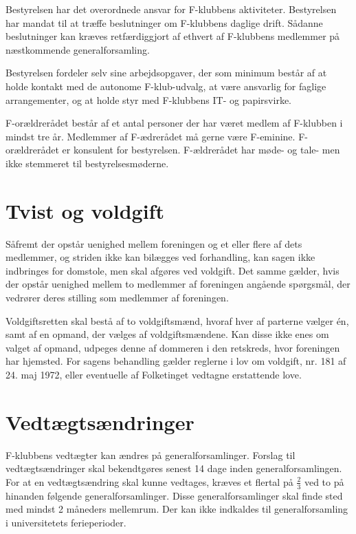 \documentclass[a4paper,12pt,danish]{article}
\begin{document}
\begin{list}
\item Bestyrelsen har det overordnede ansvar for F-klubbens
  aktiviteter. Bestyrelsen har mandat til at træffe beslutninger om
  F-klubbens daglige drift. Sådanne beslutninger kan kræves
  retfærdiggjort af ethvert af F-klubbens medlemmer på næstkommende
  generalforsamling.

  
\item Bestyrelsen fordeler selv sine arbejdsopgaver, der som minimum
  består af at holde kontakt med de autonome F-klub-udvalg, at
  være ansvarlig for faglige arrangementer, og at holde styr med
  F-klubbens IT- og papirsvirke.


\item F-orældrerådet består af et antal
  personer der har været medlem af F-klubben i mindst tre år.
  Medlemmer af F-ædrerådet må gerne være F-eminine.
  F-orældrerådet er konsulent for bestyrelsen. F-ældrerådet
  har møde- og tale- men ikke stemmeret til bestyrelsesmøderne.

\section{Tvist og voldgift}

\item Såfremt der opstår uenighed mellem foreningen og et
  eller flere af dets medlemmer, og striden ikke kan bilægges ved
  forhandling, kan sagen ikke indbringes for domstole, men skal
  afgøres ved voldgift. Det samme gælder, hvis der opstår
  uenighed mellem to medlemmer af foreningen angående
  spørgsmål, der vedrører deres stilling som medlemmer af
  foreningen. 
  
  Voldgiftsretten skal bestå af to voldgiftsmænd, hvoraf hver
  af parterne vælger \'{e}n, samt af en opmand, der vælges af
  voldgiftsmændene. Kan disse ikke enes om valget af opmand,
  udpeges denne af dommeren i den retskreds, hvor foreningen har
  hjemsted. For sagens behandling gælder reglerne i lov om
  voldgift, nr. 181 af 24. maj 1972, eller eventuelle af Folketinget
  vedtagne erstattende love.

\section{Vedtægtsændringer}
  
\item F-klubbens vedtægter kan ændres på
  generalforsamlinger. Forslag til vedtægtsændringer skal
  bekendtgøres senest 14 dage inden generalforsamlingen. For at en
  vedtægtsændring skal kunne vedtages, kræves et flertal
  på $\frac{2}{3}$ ved to på hinanden følgende
  generalforsamlinger. Disse generalforsamlinger skal finde sted med
  mindst 2 måneders mellemrum.
  Der kan ikke indkaldes til generalforsamling i universitetets ferieperioder.

\end{list}
\end{document}
